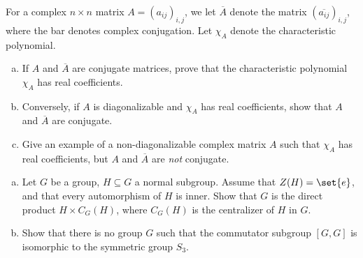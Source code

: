 \documentclass[10pt]{mypackage}
\begin{document}
\begin{problem}[Problem 2]
  For a complex $n\times n$ matrix $A = \left( a_{ij} \right)_{i,j}$, we let $ \overline{A} $ denote the matrix $ \left( \overline{a_{ij}} \right)_{i,j} $, where the bar denotes complex conjugation. Let $\chi_A$ denote the characteristic polynomial.
  \begin{enumerate}[(a)]
    \item If $ A $ and $ \overline{A} $ are conjugate matrices, prove that the characteristic polynomial $\chi_A$ has real coefficients.
    \item Conversely, if $A$ is diagonalizable and $\chi_A$ has real coefficients, show that $A$ and $ \overline{A} $ are conjugate.
    \item Give an example of a non-diagonalizable complex matrix $A$ such that $\chi_A$ has real coefficients, but $A$ and $ \overline{A} $ are \textit{not} conjugate.
  \end{enumerate}
\end{problem}
\begin{problem}[Problem 3]\hfill
  \begin{enumerate}[(a)]
    \item Let $G$ be a group, $H\subseteq G$ a normal subgroup. Assume that $Z(H) = \set{e}$, and that every automorphism of $H$ is inner. Show that $G$ is the direct product $H\times C_G(H)$, where $C_G(H)$ is the centralizer of $H$ in $G$.
    \item Show that there is no group $G$ such that the commutator subgroup $\left[ G,G \right]$ is isomorphic to the symmetric group $S_3$.
  \end{enumerate}
\end{problem}
\end{document}
